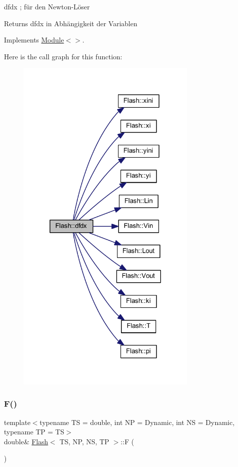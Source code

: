 dfdx ; für den Newton-\/\+Löser 

\begin{DoxyReturn}{Returns}
dfdx in Abhängigkeit der Variablen 
\end{DoxyReturn}


Implements \mbox{\hyperlink{class_module_a0762d7cbad2a73d5eff3f2f1155e8e33}{Module$<$$>$}}.

Here is the call graph for this function\+:
\nopagebreak
\begin{figure}[H]
\begin{center}
\leavevmode
\includegraphics[width=248pt]{class_flash_a83e35b3ab13b3705f0fe06c40b800a8b_cgraph}
\end{center}
\end{figure}
\mbox{\label{class_flash_ac44eff7052e26a0075c21b4f068e162e}} 
\subsubsection{\texorpdfstring{F()}{F()}}
{\footnotesize\ttfamily template$<$typename TS = double, int NP = Dynamic, int NS = Dynamic, typename TP = TS$>$ \\
double\& \mbox{\hyperlink{class_flash}{Flash}}$<$ TS, NP, NS, TP $>$\+::F (\begin{DoxyParamCaption}{ }\end{DoxyParamCaption})\hspace{0.3cm}{\ttfamily [inline]}}




